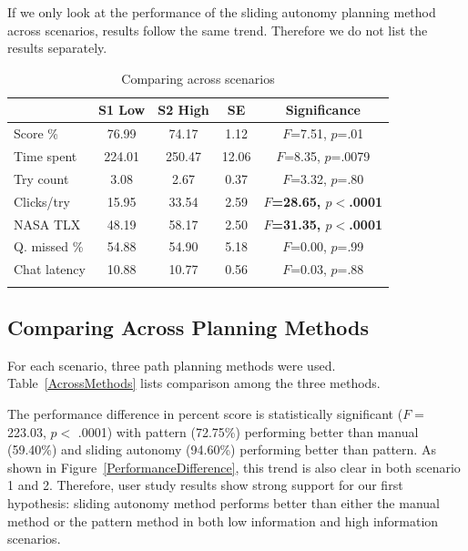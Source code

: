 \documentclass[lettersize, apacite, twoside, HRI]{apa_HRI}
\begin{document}
If we only look at the performance of the sliding autonomy planning method across scenarios, results follow the same trend. Therefore we do not list the results separately.

\begin{table}
\caption{Comparing across scenarios}
\scriptsize
	\centering
		\begin{tabular}
			{|l|c|c|c|c|}
			\hline
			& S1 Low & S2 High & SE & Significance \\
			\hline
			Score \% & 76.99 & 74.17 & 1.12 & $F$=7.51, $p$=.01 \\
			Time spent & 224.01 & 250.47 & 12.06 & $F$=8.35, $p$=.0079 \\
			Try count & 3.08 & 2.67 & 0.37 & $F$=3.32, $p$=.80 \\
			Clicks/try	& 15.95 & 33.54 & 2.59 & \textbf{$F$=28.65, $p<$.0001} \\ 
			NASA TLX & 48.19 & 58.17 & 2.50 & \textbf{$F$=31.35, $p<$.0001} \\ 
			\hline
			Q. missed \% & 54.88 & 54.90 & 5.18 & $F$=0.00, $p$=.99 \\ 
			Chat latency & 10.88 & 10.77 & 0.56 & $F$=0.03, $p$=.88 \\ 
			\hline			
			\multicolumn{5}{c}{}  %
		\end{tabular}
\label{AcrossScenarios}
\end{table}

\subsection{Comparing Across Planning Methods}

For each scenario, three path planning methods were used. Table~\ref{AcrossMethods} lists comparison among the three methods. 

The performance difference in percent score is statistically significant ($F=$ 223.03, $p<$ .0001) with pattern (72.75\%) performing better than manual (59.40\%) and sliding autonomy (94.60\%) performing better than pattern. As shown in Figure~\ref{PerformanceDifference}, this trend is also clear in both scenario 1 and 2. Therefore, user study results show strong support for our first hypothesis: sliding autonomy method performs better than either the manual method or the pattern method in both low information and high information scenarios.
\end{document}
